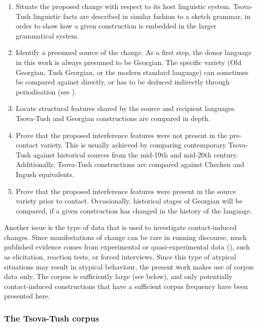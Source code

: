 \begin{enumerate}
	\item Situate the proposed change with respect to its host linguistic system. Tsova-Tush linguistic facts are described in similar fashion to a sketch grammar, in order to show how a given construction is embedded in the larger grammatical system.
	
	\item Identify a presumed source of the change.  As a first step, the donor language in this work is always presumed to be Georgian. The specific variety (Old Georgian, Tush Georgian, or the modern standard language) can sometimes be compared against directly, or has to be deduced indirectly through periodisation (see ).
	
	\item Locate structural features shared by the source and recipient languages. Tsova-Tush and Georgian constructions are compared in depth.
	
	\item Prove that the proposed interference features were not present in the pre-contact variety. This is usually achieved by comparing contemporary Tsova-Tush against historical sources from the mid-19th and mid-20th century. Additionally, Tsova-Tush constructions are compared against Chechen and Ingush equivalents.
	
	\item Prove that the proposed interference features were present in the source variety prior to contact. Occasionally, historical stages of Georgian will be compared, if a given construction has changed in the history of the language. 
	
	
\end{enumerate}

Another issue is the type of data that is used to investigate contact-induced changes. Since manifestations of change can be rare in running discourse, much published evidence comes from experimental or quasi-experimental data (\cites[396]{poplacklevey2010contact}), such as elicitation, reaction tests, or forced interviews. Since this type of atypical situations may result in atypical behaviour, the present work makes use of corpus data only. The corpus is sufficiently large (see  below), and only potentially contact-induced constructions that have a sufficient corpus frequency have been presented here.

\subsubsection{The Tsova-Tush corpus} \label{sources}

